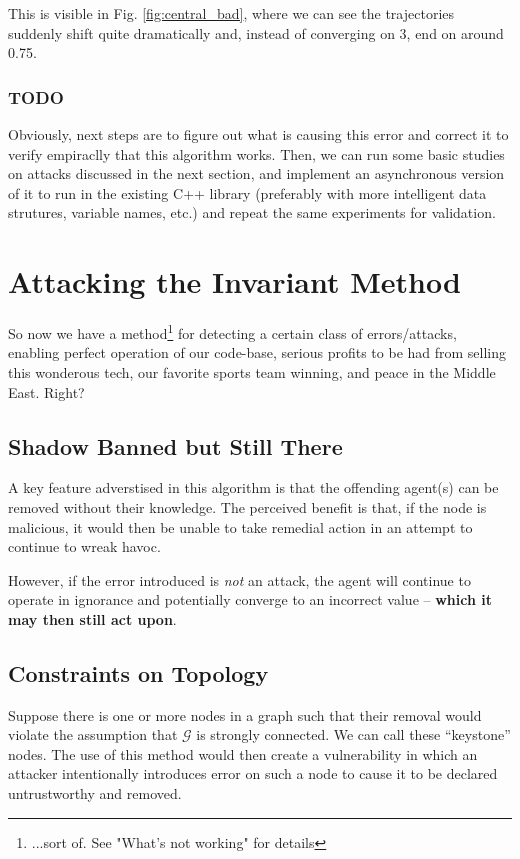 \documentclass[11pt]{article}
\begin{document}
This is visible in Fig. \ref{fig:central_bad}, where we can see the trajectories
suddenly shift quite dramatically and, instead of converging on 3, end on around
0.75.

\subsubsection*{TODO}
Obviously, next steps are to figure out what is causing this error and correct
it to verify empiraclly that this algorithm works. Then, we can run some basic
studies on attacks discussed in the next section, and implement an asynchronous
version of it to run in the existing C++ library (preferably with more
intelligent data strutures, variable names, etc.) and repeat the same
experiments for validation.

\section{Attacking the Invariant Method}
So now we have a method\footnote{...sort of. See "What's not working" for details} for detecting a certain class of errors/attacks,
enabling perfect operation of our code-base, serious profits to be had from
selling this wonderous tech, our favorite sports team winning, and peace in the
Middle East. Right?

\subsection*{Shadow Banned but Still There}
A key feature adverstised in this algorithm is that the offending agent(s) can
be removed without their knowledge. The perceived benefit is that, if the node
is malicious, it would then be unable to take remedial action in an attempt to
continue to wreak havoc.

However, if the error introduced is \textit{not} an attack, the agent will
continue to operate in ignorance and potentially converge to an incorrect value
-- \textbf{which it may then still act upon}.

\subsection*{Constraints on Topology}
Suppose there is one or more nodes in a graph such that their removal
would violate the assumption that $\mathcal{G}$ is strongly connected.
We can call these ``keystone'' nodes. The use of this method would then
create a vulnerability in which an attacker intentionally introduces
error on such a node to cause it to be declared untrustworthy and removed.
\end{document}
